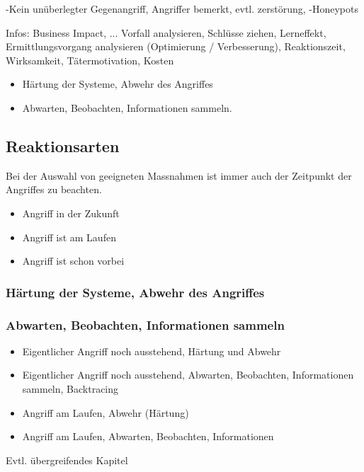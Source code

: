 -Kein unüberlegter Gegenangriff, Angriffer bemerkt, evtl. zerstörung,
-Honeypots

Infos: Business Impact, ...
Vorfall analysieren, Schlüsse ziehen, Lerneffekt, Ermittlungsvorgang analysieren (Optimierung / Verbesserung), Reaktionszeit, Wirksamkeit, Tätermotivation, Kosten

\begin{itemize}
  \item Härtung der Systeme, Abwehr des Angriffes
  \item Abwarten, Beobachten, Informationen sammeln.
\end{itemize}


\subsection{Reaktionsarten}
Bei der Auswahl von geeigneten Massnahmen ist immer auch der Zeitpunkt der Angriffes zu beachten.

\begin{itemize}
  \item Angriff in der Zukunft
  \item Angriff ist am Laufen
  \item Angriff ist schon vorbei
\end{itemize}


\subsubsection{Härtung der Systeme, Abwehr des Angriffes}

\subsubsection{Abwarten, Beobachten, Informationen sammeln}

\begin{itemize}
  \item Eigentlicher Angriff noch ausstehend, Härtung und Abwehr
  \item Eigentlicher Angriff noch ausstehend, Abwarten, Beobachten, Informationen sammeln, Backtracing
  \item Angriff am Laufen, Abwehr (Härtung)
  \item Angriff am Laufen, Abwarten, Beobachten, Informationen
\end{itemize}


Evtl. übergreifendes Kapitel
